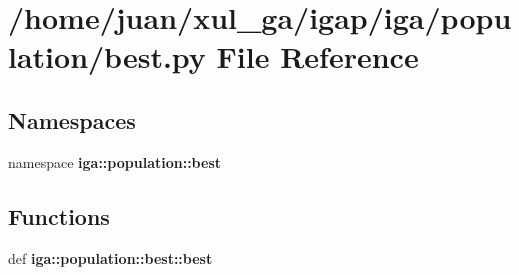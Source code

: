 \section{/home/juan/xul\_\-ga/igap/iga/population/best.py File Reference}
\label{population_2best_8py}
\subsection*{Namespaces}
\begin{CompactItemize}
\item 
namespace {\bf iga::population::best}
\end{CompactItemize}
\subsection*{Functions}
\begin{CompactItemize}
\item 
def {\bf iga::population::best::best}
\end{CompactItemize}
